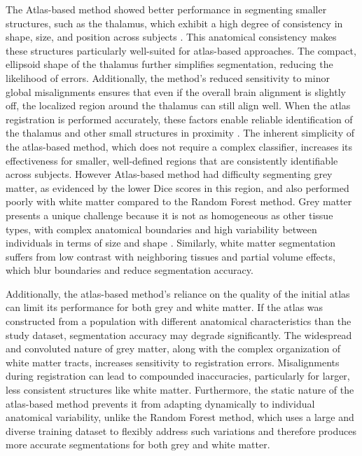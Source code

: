 The Atlas-based method showed better performance in segmenting smaller structures, such as the thalamus, which exhibit a high degree of consistency in shape, size, and position across subjects \cite{b16}. This anatomical consistency makes these structures particularly well-suited for atlas-based approaches. The compact, ellipsoid shape of the thalamus further simplifies segmentation, reducing the likelihood of errors. Additionally, the method’s reduced sensitivity to minor global misalignments ensures that even if the overall brain alignment is slightly off, the localized region around the thalamus can still align well. When the atlas registration is performed accurately, these factors enable reliable identification of the thalamus and other small structures in proximity \cite{b17}. The inherent simplicity of the atlas-based method, which does not require a complex classifier, increases its effectiveness for smaller, well-defined regions that are consistently identifiable across subjects. However Atlas-based method had difficulty segmenting grey matter, as evidenced by the lower Dice scores in this region, and also performed poorly with white matter compared to the Random Forest method. Grey matter presents a unique challenge because it is not as homogeneous as other tissue types, with complex anatomical boundaries and high variability between individuals in terms of size and shape \cite{b18}. Similarly, white matter segmentation suffers from low contrast with neighboring tissues and partial volume effects, which blur boundaries and reduce segmentation accuracy.

Additionally, the atlas-based method's reliance on the quality of the initial atlas can limit its performance for both grey and white matter. If the atlas was constructed from a population with different anatomical characteristics than the study dataset, segmentation accuracy may degrade significantly. The widespread and convoluted nature of grey matter, along with the complex organization of white matter tracts, increases sensitivity to registration errors. Misalignments during registration can lead to compounded inaccuracies, particularly for larger, less consistent structures like white matter. Furthermore, the static nature of the atlas-based method prevents it from adapting dynamically to individual anatomical variability, unlike the Random Forest method, which uses a large and diverse training dataset to flexibly address such variations and therefore produces more accurate segmentations for both grey and white matter.

